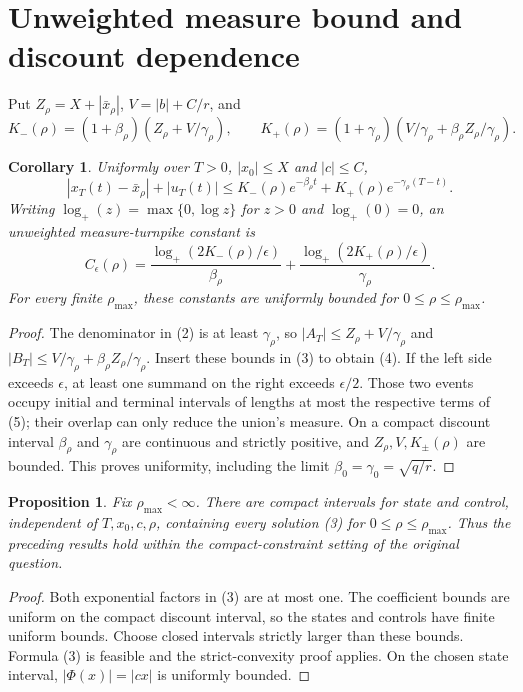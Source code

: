 \documentclass[11pt]{article}
\newtheorem{proposition}[theorem]{Proposition}
\newtheorem{corollary}[theorem]{Corollary}
\theoremstyle{definition}
\begin{document}
\section*{Unweighted measure bound and discount dependence}
Put $Z_\rho=X+|\bar x_\rho|$, $V=|b|+C/r$, and
\[
 K_-(\rho)=(1+\beta_\rho)(Z_\rho+V/\gamma_\rho),\qquad
 K_+(\rho)=(1+\gamma_\rho)(V/\gamma_\rho+
                                      \beta_\rho Z_\rho/\gamma_\rho).
\]
\begin{corollary}
Uniformly over $T>0$, $|x_0|\le X$ and $|c|\le C$,
\[
 |x_T(t)-\bar x_\rho|+|u_T(t)|
 \le K_-(\rho)e^{-\beta_\rho t}
          +K_+(\rho)e^{-\gamma_\rho(T-t)}.               \tag{4}
\]
Writing $\log_+(z)=\max\{0,\log z\}$ for $z>0$ and
$\log_+(0)=0$, an unweighted measure-turnpike constant is
\[
 C_\epsilon(\rho)=\frac{\log_+(2K_-(\rho)/\epsilon)}{\beta_\rho}
                  +\frac{\log_+(2K_+(\rho)/\epsilon)}{\gamma_\rho}.
                                                               \tag{5}
\]
For every finite $\rho_{\max}$, these constants are uniformly bounded
for $0\le\rho\le\rho_{\max}$.
\end{corollary}
\begin{proof}
The denominator in (2) is at least $\gamma_\rho$, so
$|A_T|\le Z_\rho+V/\gamma_\rho$ and
$|B_T|\le V/\gamma_\rho+\beta_\rho Z_\rho/\gamma_\rho$.
Insert these bounds in (3) to obtain (4).
If the left side exceeds $\epsilon$, at least one summand on the right
exceeds $\epsilon/2$. Those two events occupy initial and terminal
intervals of lengths at most the respective terms of (5); their overlap
can only reduce the union's measure.
On a compact discount interval $\beta_\rho$ and $\gamma_\rho$ are
continuous and strictly positive, and $Z_\rho,V,K_\pm(\rho)$ are bounded.
This proves uniformity, including the limit
$\beta_0=\gamma_0=\sqrt{q/r}$.
\end{proof}

\begin{proposition}
Fix $\rho_{\max}<\infty$. There are compact intervals for state and
control, independent of $T,x_0,c,\rho$, containing every solution (3) for
$0\le\rho\le\rho_{\max}$. Thus the preceding results hold within the
compact-constraint setting of the original question.
\end{proposition}
\begin{proof}
Both exponential factors in (3) are at most one. The coefficient bounds
are uniform on the compact discount interval, so the states and controls
have finite uniform bounds. Choose closed intervals strictly larger than
these bounds. Formula (3) is feasible and the strict-convexity proof applies.
On the chosen state interval, $|\Phi(x)|=|cx|$ is uniformly bounded.
\end{proof}
\end{document}
